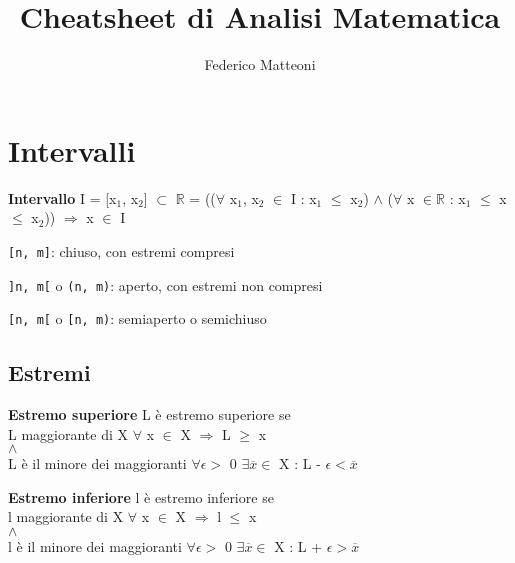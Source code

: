 \documentclass[10pt]{article}
\begin{document}
\title{Cheatsheet di Analisi Matematica}
\author{Federico Matteoni}
\date{ }
\renewcommand*\contentsname{Indice}

\maketitle
\tableofcontents
\pagebreak
\section{Intervalli}
\textbf{Intervallo} I = [x$_1$, x$_2$] $\subset$ $\mathbb{R}$ = (($\forall$ x$_1$, x$_2$ $\in$ I : x$_1$ $\leq$ x$_2$) $\wedge$ ($\forall$ x $\in \mathbb{R}$ : x$_1$ $\leq$ x $\leq$ x$_2$)) $\Rightarrow$ x $\in$ I
\begin{list}{}{}
\item \texttt{[n, m]}: chiuso, con estremi compresi
\item \texttt{]n, m[} o \texttt{(n, m)}: aperto, con estremi non compresi
\item \texttt{[n, m[} o \texttt{[n, m)}: semiaperto o semichiuso
\subsection{Estremi}
\begin{list}{-}{}
\item \textbf{Estremo superiore} L è estremo superiore se\\
L maggiorante di X $\forall$ x $\in$ X $\Rightarrow$ L $\geq$ x\\
$\wedge$\\
L è il minore dei maggioranti $\forall \epsilon >$ 0 $\exists \overline{x} \in$ X : L - $\epsilon < \overline{x}$
\item \textbf{Estremo inferiore} l è estremo inferiore se\\
l maggiorante di X $\forall$ x $\in$ X $\Rightarrow$ l $\leq$ x\\
$\wedge$\\
l è il minore dei maggioranti $\forall \epsilon >$ 0 $\exists \overline{x} \in$ X : L + $\epsilon > \overline{x}$
\end{list}
\end{list}
\end{document}
